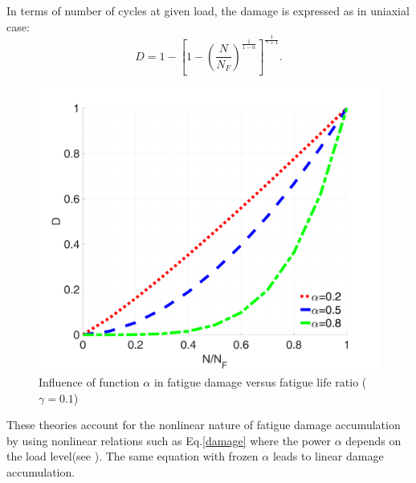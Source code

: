 In terms of number of cycles at given load, the damage is expressed as in uniaxial case:
\begin{equation}D=1-\left[ 1-\left( \frac{N}{N_F}\right) ^{\frac{1}{1-\alpha}}\right] ^{\frac{1}{\gamma+1}}.
\label{damage}
\end{equation}

\begin{figure}[!h]
	\centering
	\includegraphics[width=\textwidth]{figures//Dratio1.png}
	\vspace{-12pt}
	\caption{Influence of function $\alpha$ in fatigue damage versus fatigue life ratio ($\gamma=0.1$)}
	\label{Alpha}
\end{figure}
These theories account for the nonlinear nature of fatigue damage accumulation by using nonlinear relations such as Eq.\eqref{damage} where the power $\alpha$ depends on the load level(see ). The same equation with frozen $\alpha$ leads to linear damage accumulation.


